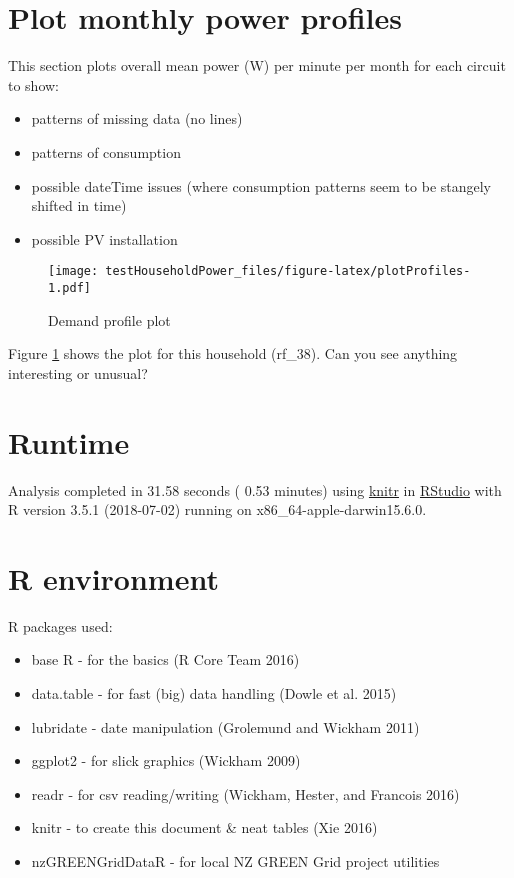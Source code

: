 \documentclass[]{article}
\providecommand{\tightlist}{%
  \setlength{\itemsep}{0pt}\setlength{\parskip}{0pt}}
\theoremstyle{definition}
\theoremstyle{definition}
\theoremstyle{definition}
\theoremstyle{remark}
\begin{document}
\section{Plot monthly power profiles}\label{plot-monthly-power-profiles}

This section plots overall mean power (W) per minute per month for each
circuit to show:

\begin{itemize}
\tightlist
\item
  patterns of missing data (no lines)
\item
  patterns of consumption
\item
  possible dateTime issues (where consumption patterns seem to be
  stangely shifted in time)
\item
  possible PV installation
\end{itemize}

\begin{figure}
\centering
\texttt{[image: testHouseholdPower\_files/figure-latex/plotProfiles-1.pdf]}
\caption{\label{fig:plotProfiles}Demand profile plot}
\end{figure}

Figure \ref{fig:plotProfiles} shows the plot for this household
(rf\_38). Can you see anything interesting or unusual?

\section{Runtime}\label{runtime}

Analysis completed in 31.58 seconds ( 0.53 minutes) using
\href{https://cran.r-project.org/package=knitr}{knitr} in
\href{http://www.rstudio.com}{RStudio} with R version 3.5.1 (2018-07-02)
running on x86\_64-apple-darwin15.6.0.

\section{R environment}\label{r-environment}

R packages used:

\begin{itemize}
\tightlist
\item
  base R - for the basics (R Core Team 2016)
\item
  data.table - for fast (big) data handling (Dowle et al. 2015)
\item
  lubridate - date manipulation (Grolemund and Wickham 2011)
\item
  ggplot2 - for slick graphics (Wickham 2009)
\item
  readr - for csv reading/writing (Wickham, Hester, and Francois 2016)
\item
  knitr - to create this document \& neat tables (Xie 2016)
\item
  nzGREENGridDataR - for local NZ GREEN Grid project utilities
\end{itemize}
\end{document}
